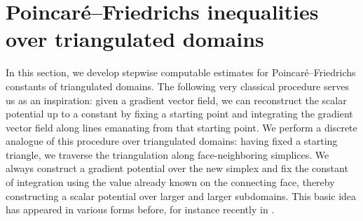 \documentclass[10pt,a4paper]{article}
\newcommand\cye[1]{%
\protect\leavevmode
\begingroup
    \color{blue}%
    #1%
\endgroup
}
\begin{document}
\section{Poincar\'e--Friedrichs inequalities over triangulated domains}\label{section:gradient}

In this section, we develop stepwise computable estimates for Poincar\'e--Friedrichs constants of triangulated domains. 
The following very classical procedure serves us as an inspiration: given a gradient vector field, we can reconstruct the scalar potential up to a constant by fixing a starting point and integrating the gradient vector field along lines emanating from that starting point. 
We perform a discrete analogue of this procedure over triangulated domains: 
having fixed a starting triangle, we traverse the triangulation along face-neighboring simplices.
We always construct a gradient potential over the new simplex and fix the constant of integration using the value already known on the connecting face, thereby constructing a scalar potential over larger and larger subdomains.
This basic idea has appeared in various forms before, for instance recently in \cite{Brae_Pill_Sch_p_rob_09, ern2020stable, Chaum_Voh_p_rob_3D_H_curl_24, Voh_loc_glob_H1_24}.



% 
\end{document}
